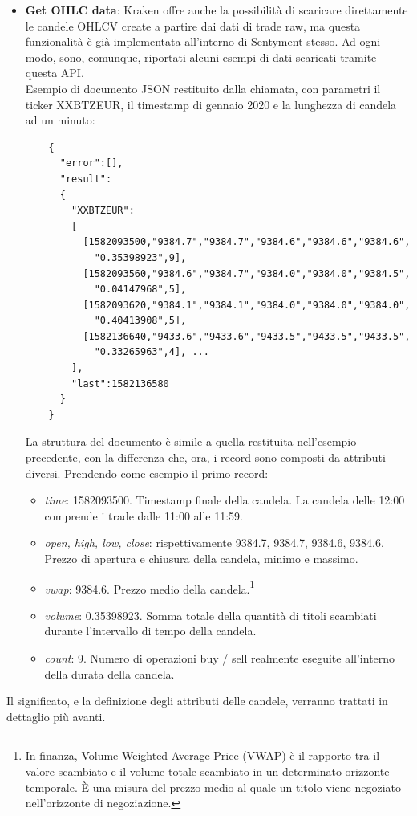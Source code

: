 \documentclass[a4paper,12pt]{report}
\begin{document}
\begin{itemize}
	\item \textbf{Get OHLC data}: Kraken offre anche la possibilità di scaricare direttamente le candele OHLCV create a partire dai dati di trade raw, ma questa funzionalità è già implementata all'interno di Sentyment stesso. Ad ogni modo, sono, comunque, riportati alcuni esempi di dati scaricati tramite questa API.\\
	Esempio di documento JSON restituito dalla chiamata, con parametri il ticker XXBTZEUR, il timestamp di gennaio 2020 e la lunghezza di candela ad un minuto:
	\begin{verbatim}
	{
	  "error":[],
	  "result":
	  {
	    "XXBTZEUR":
	    [
	      [1582093500,"9384.7","9384.7","9384.6","9384.6","9384.6",
	        "0.35398923",9],
	      [1582093560,"9384.6","9384.7","9384.0","9384.0","9384.5",
	        "0.04147968",5],
	      [1582093620,"9384.1","9384.1","9384.0","9384.0","9384.0",
	        "0.40413908",5],
	      [1582136640,"9433.6","9433.6","9433.5","9433.5","9433.5",
	        "0.33265963",4], ...
	    ],
	    "last":1582136580
	  }
	} 
	\end{verbatim}
	
La struttura del documento è simile a quella restituita nell'esempio precedente, con la differenza che, ora, i record sono composti da attributi diversi. Prendendo come esempio il primo record:
	\begin{itemize}
		\item \textit{time}: 1582093500. Timestamp finale della candela. La candela delle 12:00 comprende i trade dalle 11:00 alle 11:59.
		\item \textit{open, high, low, close}: rispettivamente 9384.7, 9384.7, 9384.6, 9384.6. Prezzo di apertura e chiusura della candela, minimo e massimo.
		\item \textit{vwap}: 9384.6. Prezzo medio della candela.\footnote{In finanza, Volume Weighted Average Price (VWAP) è il rapporto tra il valore scambiato e il volume totale scambiato in un determinato orizzonte temporale. È una misura del prezzo medio al quale un titolo viene negoziato nell'orizzonte di negoziazione.}
		\item \textit{volume}: 0.35398923. Somma totale della quantità di titoli scambiati durante l'intervallo di tempo della candela.
		\item \textit{count}: 9. Numero di operazioni buy / sell realmente eseguite all'interno della durata della candela.
	\end{itemize}
\end{itemize}
Il significato, e la definizione degli attributi delle candele, verranno trattati in dettaglio più avanti.\\
\end{document}
